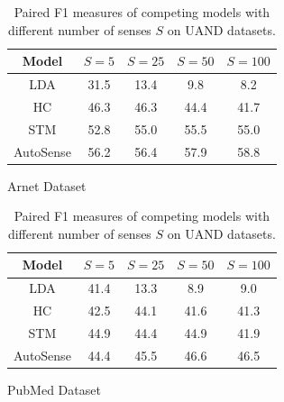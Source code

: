 \documentclass[letterpaper]{article}
\begin{document}
\begin{table}[]
    \centering
    \begin{subtable}{0.47\textwidth}
    \centering
    \begin{adjustbox}{width=0.74\columnwidth}
\begin{tabular}{|c|cccc|}
        \hline
        Model & $S=5$ & $S=25$ & $S=50$ & $S=100$ \\
        \hline
        LDA & 31.5 & 13.4 & 9.8 & 8.2 \\
        HC & 46.3 & 46.3 & 44.4 & 41.7 \\
        STM & 52.8 & 55.0 & 55.5 & 55.0 \\
        AutoSense & 56.2 & 56.4 & 57.9 & 58.8 \\
        \hline
    \end{tabular}
\end{adjustbox}
    \caption{Arnet Dataset}
    \end{subtable}
	\newline
    \vspace*{2pt}
    \newline
    \begin{subtable}{0.47\textwidth}
    \centering
    \begin{adjustbox}{width=0.74\columnwidth}
\begin{tabular}{|c|cccc|}
        \hline
        Model & $S=5$ & $S=25$ & $S=50$ & $S=100$ \\
        \hline
        LDA & 41.4 & 13.3 & 8.9 & 9.0 \\
        HC & 42.5 & 44.1 & 41.6 & 41.3 \\
        STM & 44.9 & 44.4 & 44.9 & 41.9 \\
        AutoSense & 44.4 & 45.5 & 46.6 & 46.5 \\
        \hline
    \end{tabular}
\end{adjustbox}
    \caption{PubMed Dataset}
    \end{subtable}
    \caption{Paired F1 measures of competing models with different number of senses $S$ on UAND datasets.}
	\label{fig:andresults}
\end{table}

\end{document}
